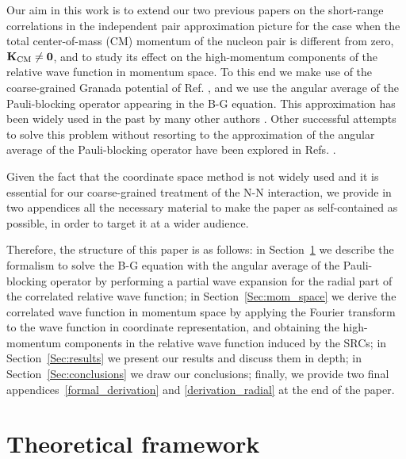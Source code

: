 \documentclass[aps,twocolumn,showpacs,preprintnumbers,amsmath,amssymb,nofootinbib,superscriptaddress,showkeys,noeprint]{revtex4-1}
\newcommand{\nK}{{\bf K}}
\begin{document}
Our aim in this work is to extend our two previous papers
\cite{RuizSimo:2016vsh, RuizSimo:2017tcb} on the short-range
correlations in the independent pair approximation picture
\cite{Viollier:1976ab} for the case when the total center-of-mass (CM)
momentum of the nucleon pair is different from zero, $\nK_{\rm CM}\ne
\mathbf{0}$, and to study its effect on the high-momentum components
of the relative wave function in momentum space. To this end we make
use of the coarse-grained Granada potential of
Ref. \cite{Perez:2013mwa}, and we use the angular average of the
Pauli-blocking operator appearing in the B-G equation. This
approximation has been widely used in the past by many other authors
\cite{Brueckner:1958zz, Bhargava:1967a, Kallio:1969mis, Haftel:1970zz,
  Jeukenne:1974zz, Muther:1995bk, Alonso:2003aq}.  Other successful
attempts to solve this problem without resorting to the approximation
of the angular average of the Pauli-blocking operator have been
explored in Refs. \cite{werner1959solution, Cheon:1988hn,
  Schiller:1998ff, Suzuki:1999jb, Sammarruca:2000dd,
  Stephenson:2004xs, White:2014oca}.
  
Given the fact that the coordinate space method is not widely used and
it is essential for our coarse-grained treatment of the N-N
interaction, we provide in two appendices all the necessary material
to make the paper as self-contained as possible, in order to target it
at a wider audience.

Therefore, the structure of this paper is as follows: in
Section~\ref{sect:framework} we describe the formalism to solve the
B-G equation with the angular average of the Pauli-blocking operator
by performing a partial wave expansion for the radial part of the
correlated relative wave function; in Section~\ref{Sec:mom_space} we
derive the correlated wave function in momentum space by applying the
Fourier transform to the wave function in coordinate representation,
and obtaining the high-momentum components in the relative wave
function induced by the SRCs; in Section~\ref{Sec:results} we present
our results and discuss them in depth; in
Section~\ref{Sec:conclusions} we draw our conclusions; finally, we
provide two final appendices~\ref{formal_derivation} and
\ref{derivation_radial} at the end of the paper.

\section{Theoretical framework}\label{sect:framework}
\end{document}
